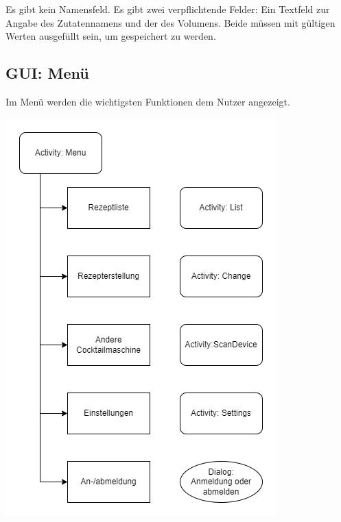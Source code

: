 Es gibt kein Namensfeld. Es gibt zwei verpflichtende Felder: Ein Textfeld zur Angabe des Zutatennamens und der des Volumens. Beide müssen mit gültigen Werten ausgefüllt sein, um gespeichert zu werden.


\subsection{GUI: Menü}

Im Menü werden die wichtigsten Funktionen dem Nutzer angezeigt.

\includegraphics[scale=0.65]{Menu.png}
\newpage
